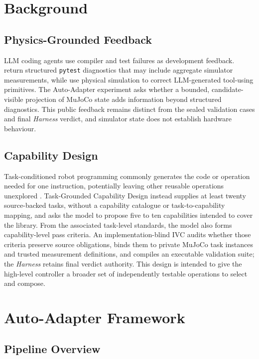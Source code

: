 \section{Background}

\subsection{Physics-Grounded Feedback}

LLM coding agents use compiler and test failures as development feedback.
\citet{tripathi2026testdriven} return structured \texttt{pytest} diagnostics
that may include aggregate simulator measurements, while
\citet{kim2026physicalcorrection} use physical simulation to correct
LLM-generated tool-using primitives. The Auto-Adapter experiment asks whether
a bounded, candidate-visible projection of MuJoCo state adds information beyond
structured diagnostics. This public feedback remains distinct from the sealed
validation cases and final \emph{Harness} verdict, and simulator state does not
establish hardware behaviour.

\subsection{Capability Design}

Task-conditioned robot programming commonly generates the code or operation
needed for one instruction, potentially leaving other reusable operations
unexplored \citep{liang2023codeaspolicies,mu2024robocodex}. Task-Grounded
Capability Design instead supplies at least twenty source-backed tasks, without
a capability catalogue or task-to-capability mapping, and asks the model to
propose five to ten capabilities intended to cover the library. From the
associated task-level standards, the model also forms capability-level pass
criteria. An implementation-blind IVC audits whether those criteria preserve
source obligations, binds them to private MuJoCo task instances and trusted
measurement definitions, and compiles an executable validation suite; the
\emph{Harness} retains final verdict authority. This design is intended to give
the high-level controller a broader set of independently testable operations
to select and compose.

\section{Auto-Adapter Framework}

\subsection{Pipeline Overview}

